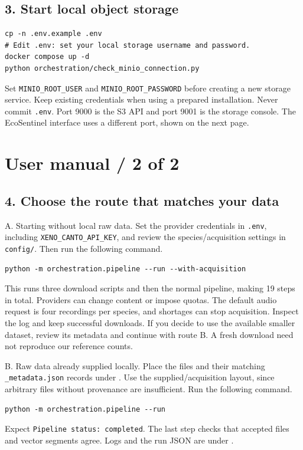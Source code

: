 \documentclass[10pt,a4paper]{article}
\begin{document}
\subsection*{3. Start local object storage}
\begin{Verbatim}
cp -n .env.example .env
# Edit .env: set your local storage username and password.
docker compose up -d
python orchestration/check_minio_connection.py
\end{Verbatim}
Set \texttt{MINIO\_ROOT\_USER} and \texttt{MINIO\_ROOT\_PASSWORD} before creating a new storage service. Keep existing credentials when using a prepared installation. Never commit \texttt{.env}. Port 9000 is the S3 API and port 9001 is the storage console. The EcoSentinel interface uses a different port, shown on the next page.

\clearpage\thispagestyle{empty}
\section*{User manual / 2 of 2}
\subsection*{4. Choose the route that matches your data}
A. Starting without local raw data. Set the provider credentials in \texttt{.env}, including \texttt{XENO\_CANTO\_API\_KEY}, and review the species/acquisition settings in \texttt{config/}. Then run the following command.
\begin{Verbatim}
python -m orchestration.pipeline --run --with-acquisition
\end{Verbatim}
This runs three download scripts and then the normal pipeline, making 19 steps in total. Providers can change content or impose quotas. The default audio request is four recordings per species, and shortages can stop acquisition. Inspect the log and keep successful downloads. If you decide to use the available smaller dataset, review its metadata and continue with route B. A fresh download need not reproduce our reference counts.

B. Raw data already supplied locally. Place the files and their matching \texttt{\_metadata.json} records under . Use the supplied/acquisition layout, since arbitrary files without provenance are insufficient. Run the following command.
\begin{Verbatim}
python -m orchestration.pipeline --run
\end{Verbatim}
Expect \texttt{Pipeline status: completed}. The last step checks that accepted files and vector segments agree. Logs and the run JSON are under .
\end{document}
